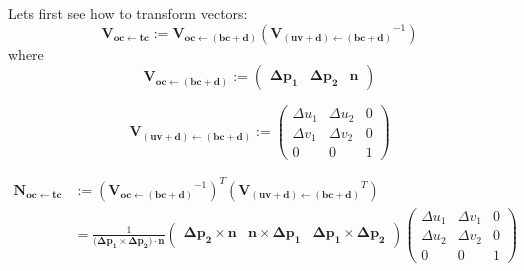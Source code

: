 \documentclass{article}
\newcommand{\vctr}[1]{\mathbf{#1}}
\newcommand{\point}[1]{\mathbf{#1}}
\newcommand{\mat}[1]{\mathbf{#1}}
\newcommand{\vMat}[2]{\mat{V_{#1 \leftarrow #2}}}
\newcommand{\nMat}[2]{\mat{N_{#1 \leftarrow #2}}}
\begin{document}
Lets first see how to transform vectors:
\begin{equation*}
 \vMat{oc}{tc} := \vMat{oc}{(bc+d)}(\vMat{(uv+d)}{(bc+d)}^{-1}) 
\end{equation*}
where
\begin{equation}
\label{eq:vmat_oc_from_bdc}
 \vMat{oc}{(bc+d)} := \begin{pmatrix} 
                  \point{\Delta p_1} & \point{\Delta p_2} & \vctr{n} 
                 \end{pmatrix}
\end{equation}

\begin{equation}
 \vMat{(uv+d)}{(bc+d)} := \begin{pmatrix} 
                  \Delta u_1 & \Delta u_2 & 0 \\
                  \Delta v_1 & \Delta v_2 & 0 \\
                  0 & 0 & 1 
                 \end{pmatrix}
\end{equation}

\begin{align*}
\nMat{oc}{tc} &:= (\vMat{oc}{(bc+d)}^{-1})^T(\vMat{(uv+d)}{(bc+d)}^T) \\
  &= \frac{1}{(\point{\Delta p_1} \times \point{\Delta p_2)}\cdot \vctr{n}}\begin{pmatrix} 
        \point{\Delta p_2} \times \vctr{n} & \vctr{n} \times \point{\Delta p_1} & \point{\Delta p_1} \times \point{\Delta p_2}
     \end{pmatrix}
     \begin{pmatrix} 
                  \Delta u_1 & \Delta v_1 & 0 \\
                  \Delta u_2 & \Delta v_2 & 0 \\
                  0 & 0 & 1 
     \end{pmatrix}
\end{align*}
\end{document}

